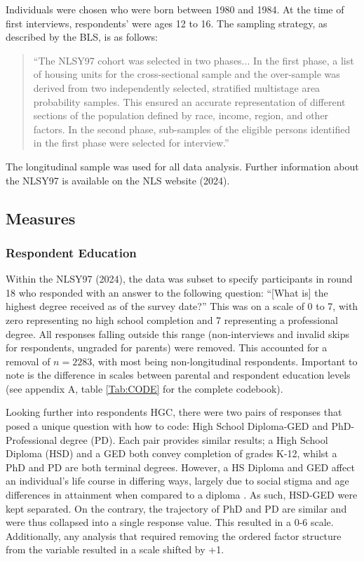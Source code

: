 \documentclass[jou,12pt,floatsintext]{apa7}
\begin{document}
Individuals were chosen who were born between 1980 and 1984. At the time of first interviews, respondents' were ages 12 to 16. The sampling strategy, as described by the BLS, is as follows:
\begin{quote}
  “The NLSY97 cohort was selected in two phases... In the first phase, a list of housing units for the cross-sectional sample and the over-sample was derived from two independently selected, stratified multistage area probability samples. This ensured an accurate representation of different sections of the population defined by race, income, region, and other factors. In the second phase, sub-samples of the eligible persons identified in the first phase were selected for interview.”
\end{quote}
The longitudinal sample was used for all data analysis. Further information about the NLSY97 is available on the NLS website (2024).

\subsection{Measures}
\subsubsection{Respondent Education}
Within the NLSY97 (2024), the data was subset to specify participants in round 18 who responded with an answer to the following question: “[What is] the highest degree received as of the survey date?” This was on a scale of 0 to 7, with zero representing no high school completion and 7 representing a professional degree. All responses falling outside this range (non-interviews and invalid skips for respondents, ungraded for parents) were removed. This accounted for a removal of $\textit{n} = 2283$, with most being non-longitudinal respondents. Important to note is the difference in scales between parental and respondent education levels (see appendix A, table \ref{Tab:CODE} for the complete codebook).

Looking further into respondents HGC, there were two pairs of responses that posed a unique question with how to code: High School Diploma-GED and PhD-Professional degree (PD). Each pair provides similar results; a High School Diploma (HSD) and a GED both convey completion of grades K-12, whilst a PhD and PD are both terminal degrees. However, a HS Diploma and GED affect an individual's life course in differing ways, largely due to social stigma and age differences in attainment when compared to a diploma \parencite{maralaniGEDCollegeAge2011}. As such, HSD-GED were kept separated. On the contrary, the trajectory of PhD and PD are similar and were thus collapsed into a single response value. This resulted in a 0-6 scale. Additionally, any analysis that required removing the ordered factor structure from the variable resulted in a scale shifted by +1.
\end{document}
